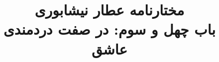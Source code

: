 \documentclass[14pt,b5paper]{article}
\begin{document}
\title{\Huge مختارنامه عطار نیشابوری \\
باب چهل و سوم: در صفت دردمندی عاشق}
\author{ }
\date{ }
\maketitle
\newpage
\tableofcontents
\newpage

\newpage

\newpage

\newpage

\newpage

\newpage

\newpage

\newpage

\newpage

\newpage

\newpage

\newpage

\newpage

\newpage

\newpage

\newpage

\newpage

\newpage

\newpage

\newpage

\newpage

\newpage

\newpage

\newpage

\newpage
\end{document}
